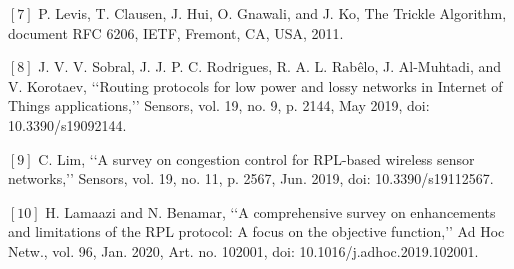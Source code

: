 \documentclass[a4paper]{report}
\begin{document}
\begin{flushleft}
{{\noindent    $\left[ 7 \right]$ P. Levis, T. Clausen, J. Hui, O. Gnawali, and J. Ko, The Trickle Algorithm, document RFC 6206, IETF, Fremont, CA, USA, 2011.
    \par \vspace{0.2cm}
    
\noindent    $\left[ 8 \right]$ J. V. V. Sobral, J. J. P. C. Rodrigues, R. A. L. Rabêlo, J. Al-Muhtadi, and V. Korotaev, ‘‘Routing protocols for low power and lossy networks in Internet of Things applications,’’ Sensors, vol. 19, no. 9, p. 2144, May 2019, doi: 10.3390/s19092144.
    \par \vspace{0.2cm}   
    
\noindent    $\left[ 9 \right]$ C. Lim, ‘‘A survey on congestion control for RPL-based wireless sensor networks,’’ Sensors, vol. 19, no. 11, p. 2567, Jun. 2019, doi: 10.3390/s19112567.
    \par \vspace{0.2cm}
    
\noindent    $\left[ 10 \right]$ H. Lamaazi and N. Benamar, ‘‘A comprehensive survey on enhancements and limitations of the RPL protocol: A focus on the objective function,’’ Ad Hoc Netw., vol. 96, Jan. 2020, Art. no. 102001, doi: 10.1016/j.adhoc.2019.102001.
    \par \vspace{0.2cm}   
    
    }}
\end{flushleft}

\end{document}
